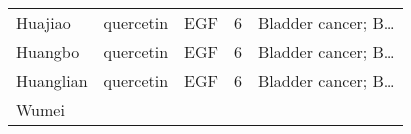 \documentclass[
]{article}
\begin{document}
\begin{longtable}[]{@{}lllll@{}}
\begin{minipage}[t]{0.17\columnwidth}
Huajiao\strut
\end{minipage} & \begin{minipage}[t]{0.16\columnwidth}\raggedright
quercetin\strut
\end{minipage} & \begin{minipage}[t]{0.12\columnwidth}\raggedright
EGF\strut
\end{minipage} & \begin{minipage}[t]{0.19\columnwidth}\raggedright
6\strut
\end{minipage} & \begin{minipage}[t]{0.21\columnwidth}\raggedright
Bladder cancer; B\ldots{}\strut
\end{minipage}\tabularnewline
\begin{minipage}[t]{0.17\columnwidth}\raggedright
Huangbo\strut
\end{minipage} & \begin{minipage}[t]{0.16\columnwidth}\raggedright
quercetin\strut
\end{minipage} & \begin{minipage}[t]{0.12\columnwidth}\raggedright
EGF\strut
\end{minipage} & \begin{minipage}[t]{0.19\columnwidth}\raggedright
6\strut
\end{minipage} & \begin{minipage}[t]{0.21\columnwidth}\raggedright
Bladder cancer; B\ldots{}\strut
\end{minipage}\tabularnewline
\begin{minipage}[t]{0.17\columnwidth}\raggedright
Huanglian\strut
\end{minipage} & \begin{minipage}[t]{0.16\columnwidth}\raggedright
quercetin\strut
\end{minipage} & \begin{minipage}[t]{0.12\columnwidth}\raggedright
EGF\strut
\end{minipage} & \begin{minipage}[t]{0.19\columnwidth}\raggedright
6\strut
\end{minipage} & \begin{minipage}[t]{0.21\columnwidth}\raggedright
Bladder cancer; B\ldots{}\strut
\end{minipage}\tabularnewline
\begin{minipage}[t]{0.17\columnwidth}\raggedright
Wumei\strut
\end{minipage} & \begin{minipage}[t]{0.16\columnwidth}\raggedright

\end{minipage}
\end{longtable}
\end{document}
